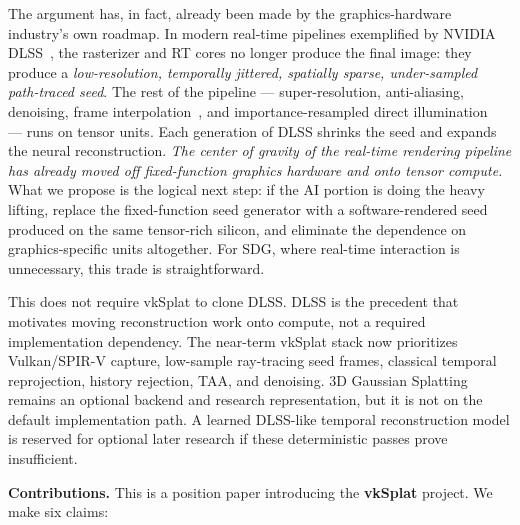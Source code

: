 \documentclass[10pt,journal]{IEEEtran}
\begin{document}
The argument has, in fact, already been made by the
graphics-hardware industry's own roadmap. In modern real-time pipelines
exemplified by NVIDIA DLSS~\cite{nvidia-dlss,liu2020nsrr,nvidia-dlss3},
the rasterizer and RT cores no longer produce the final image: they
produce a \emph{low-resolution, temporally jittered, spatially sparse,
under-sampled path-traced seed}. The rest of the pipeline ---
super-resolution, anti-aliasing, denoising, frame
interpolation~\cite{schied2017svgf,chaitanya2017interactive,nvidia-nrd},
and importance-resampled direct illumination~\cite{bitterli2020restir} ---
runs on tensor units. Each generation of DLSS shrinks the seed and
expands the neural reconstruction. \emph{The center of gravity of the
real-time rendering pipeline has already moved off fixed-function
graphics hardware and onto tensor compute.} What we propose is the
logical next step: if the AI portion is doing the heavy lifting, replace
the fixed-function seed generator with a software-rendered seed produced
on the same tensor-rich silicon, and eliminate the dependence on
graphics-specific units altogether. For SDG, where real-time interaction
is unnecessary, this trade is straightforward.

This does not require vkSplat to clone DLSS. DLSS is the precedent that
motivates moving reconstruction work onto compute, not a required
implementation dependency. The near-term vkSplat stack now prioritizes
Vulkan/SPIR-V capture, low-sample ray-tracing seed frames, classical
temporal reprojection, history rejection, TAA, and denoising. 3D
Gaussian Splatting remains an optional backend and research
representation, but it is not on the default implementation path. A
learned DLSS-like temporal reconstruction model is reserved for optional
later research if these deterministic passes prove insufficient.

\textbf{Contributions.} This is a position paper introducing the
\textbf{vkSplat} project. We make six claims:
\end{document}
